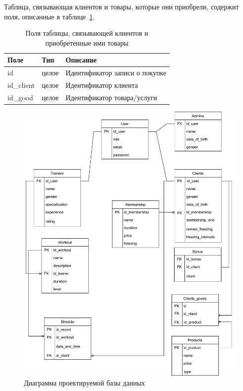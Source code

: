 Таблица, связывающая клиентов и товары, которые они приобрели, содержит поля, описанные в таблице~\ref{tbl:pol_client_good}.
\begin{table}[h!]
	\begin{center}
		\begin{threeparttable}
			\captionsetup{justification=raggedright,singlelinecheck=off}
			\caption{\label{tbl:pol_client_good} Поля таблицы, связывающей клиентов и приобретенные ими товары}
			\begin{tabular}{|p{4cm}|p{4cm}|p{6cm}|}
				\hline
				Поле & Тип & Описание \\
				\hline
				id & целое & Идентификатор записи о покупке \\
				\hline
				id\_client & целое & Идентификатор клиента \\
				\hline
				id\_good & целое & Идентификатор товара/услуги \\
				\hline
			\end{tabular}
		\end{threeparttable}
	\end{center}
\end{table}

\clearpage

\begin{figure}[h!]
	\centering
	\includegraphics[width=\linewidth]{img/diagramma}
	\caption{Диаграмма проектируемой базы данных}
	\label{fig:diag}
\end{figure}

